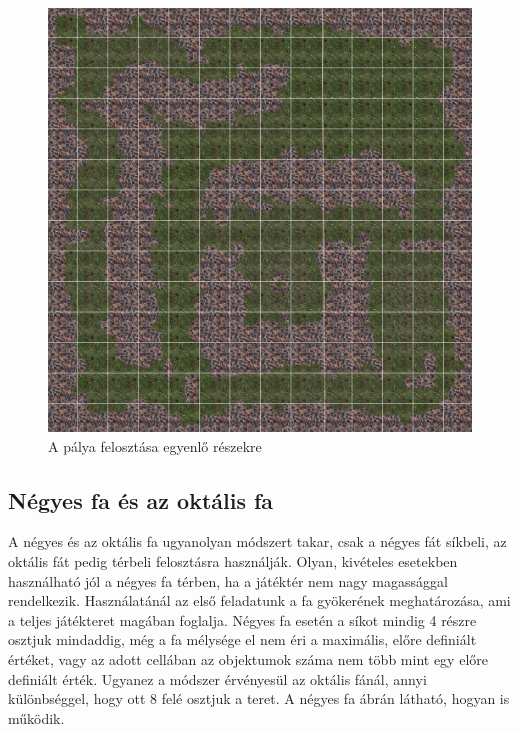 \begin{figure}[h]
\centering
\includegraphics[scale=0.2]{kepek/grid.png}
\caption{A pálya felosztása egyenlő részekre}
\label{fig:grid}
\end{figure}

\subsection{Négyes fa és az oktális fa}

A négyes és az oktális fa ugyanolyan módszert takar, csak a négyes fát síkbeli, az oktális fát pedig térbeli felosztásra használják. Olyan, kivételes esetekben használható jól a négyes fa térben, ha a játéktér nem nagy magassággal rendelkezik. Használatánál az első feladatunk a fa gyökerének meghatározása, ami a teljes játékteret magában foglalja. Négyes fa esetén a síkot mindig 4 részre osztjuk mindaddig, még a fa mélysége el nem éri a maximális, előre definiált értéket, vagy az adott cellában az objektumok száma nem több mint egy előre definiált érték. Ugyanez a módszer érvényesül az oktális fánál, annyi különbséggel, hogy ott 8 felé osztjuk a teret. A négyes fa  ábrán látható, hogyan is működik.

